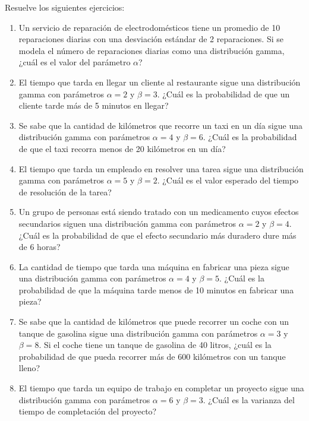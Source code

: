 \begin{Ejer}
Resuelve los siguientes ejercicios:

\begin{enumerate}
    \item Un servicio de reparación de electrodomésticos tiene un promedio de 10 reparaciones diarias con una desviación estándar de 2 reparaciones. Si se modela el número de reparaciones diarias como una distribución gamma, ¿cuál es el valor del parámetro $\alpha$?

    \item El tiempo que tarda en llegar un cliente al restaurante sigue una distribución gamma con parámetros $\alpha=2$ y $\beta=3$. ¿Cuál es la probabilidad de que un cliente tarde más de 5 minutos en llegar?

    \item Se sabe que la cantidad de kilómetros que recorre un taxi en un día sigue una distribución gamma con parámetros $\alpha=4$ y $\beta=6$. ¿Cuál es la probabilidad de que el taxi recorra menos de 20 kilómetros en un día?

    \item El tiempo que tarda un empleado en resolver una tarea sigue una distribución gamma con parámetros $\alpha=5$ y $\beta=2$. ¿Cuál es el valor esperado del tiempo de resolución de la tarea?

    \item Un grupo de personas está siendo tratado con un medicamento cuyos efectos secundarios siguen una distribución gamma con parámetros $\alpha=2$ y $\beta=4$. ¿Cuál es la probabilidad de que el efecto secundario más duradero dure más de 6 horas?

    \item La cantidad de tiempo que tarda una máquina en fabricar una pieza sigue una distribución gamma con parámetros $\alpha=4$ y $\beta=5$. ¿Cuál es la probabilidad de que la máquina tarde menos de 10 minutos en fabricar una pieza?

    \item Se sabe que la cantidad de kilómetros que puede recorrer un coche con un tanque de gasolina sigue una distribución gamma con parámetros $\alpha=3$ y $\beta=8$. Si el coche tiene un tanque de gasolina de 40 litros, ¿cuál es la probabilidad de que pueda recorrer más de 600 kilómetros con un tanque lleno?

    \item El tiempo que tarda un equipo de trabajo en completar un proyecto sigue una distribución gamma con parámetros $\alpha=6$ y $\beta=3$. ¿Cuál es la varianza del tiempo de completación del proyecto?


\end{enumerate}
\end{Ejer}
